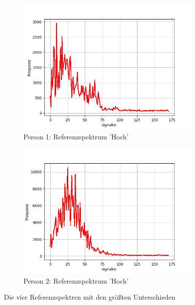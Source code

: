\documentclass[12pt, oneside, a4paper, \docLanguage]{report}
\begin{document}
\begin{figure}[H]
\begin{subfigure}{.5\textwidth}
 		 \includegraphics[width=.95\linewidth]{../data/img/Versuch2/2Averagehoch.png}
  		\caption{Person 1: Referenzspektrum 'Hoch'}
 		 \label{fig:sub3}
	\end{subfigure}%
	\begin{subfigure}{.5\textwidth}
  		\centering
 		 \includegraphics[width=.95\linewidth]{../data/img/Versuch2/Averagehoch.png}
  		\caption{ Person 2: Referenzspektrum 'Hoch'}
  		\label{fig:sub4}
	\end{subfigure}
	\caption{Die vier Referenzspektren mit den größten Unterschieden}
	\label{fig:test2}
\end{figure}
\newpage
\end{document}

